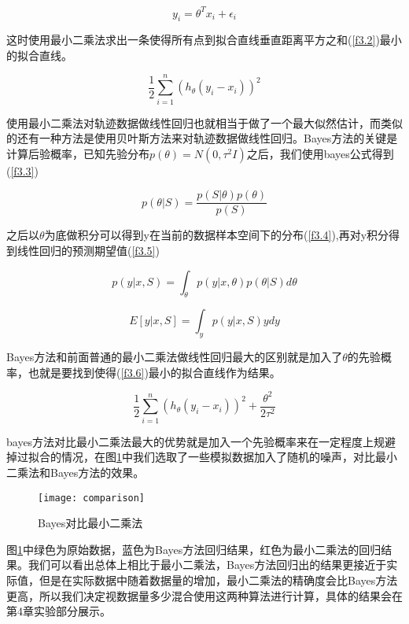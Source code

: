 \begin{equation}
y_{i} = \theta^{T}x_{i}+ \epsilon_{i}
\label{f3.1}
\end{equation}

这时使用最小二乘法求出一条使得所有点到拟合直线垂直距离平方之和(\ref{f3.2})最小的拟合直线。

\begin{equation}
\frac{1}{2} \sum_{i=1}^{n} (h_{\theta} (y_{i}-x_{i}))^{2}
\label{f3.2}
\end{equation}

使用最小二乘法对轨迹数据做线性回归也就相当于做了一个最大似然估计，而类似的还有一种方法是使用贝叶斯方法来对轨迹数据做线性回归。Bayes方法的关键是计算后验概率，已知先验分布$p(\theta )= N(0,\tau^{2}I)$之后，我们使用bayes公式得到(\ref{f3.3})

\begin{equation}
p(\theta |S) = \frac{p(S|\theta )p(\theta )}{p(S)} 
\label{f3.3}
\end{equation}

之后以$\theta$为底做积分可以得到y在当前的数据样本空间下的分布(\ref{f3.4}),再对y积分得到线性回归的预测期望值(\ref{f3.5})

\begin{equation}
p(y|x,S)=\int_{\theta}p(y|x,\theta )p(\theta |S)d\theta
\label{f3.4}
\end{equation}

\begin{equation}
E[y|x,S]=\int_{y}p(y|x,S)ydy
\label{f3.5}
\end{equation}

Bayes方法和前面普通的最小二乘法做线性回归最大的区别就是加入了$\theta$的先验概率，也就是要找到使得(\ref{f3.6})最小的拟合直线作为结果。

\begin{equation}
\frac{1}{2} \sum_{i=1}^{n} (h_{\theta} (y_{i}-x_{i}))^{2} + \frac{\theta ^{2}}{2\tau ^{2}}
\label{f3.6}
\end{equation}

bayes方法对比最小二乘法最大的优势就是加入一个先验概率来在一定程度上规避掉过拟合的情况，在图\ref{fig:3.2}中我们选取了一些模拟数据加入了随机的噪声，对比最小二乘法和Bayes方法的效果。

\begin{figure}[H] 
  \centering
  \texttt{[image: comparison]}
  \caption{Bayes对比最小二乘法}
  \label{fig:3.2}
\end{figure}

图\ref{fig:3.2}中绿色为原始数据，蓝色为Bayes方法回归结果，红色为最小二乘法的回归结果。我们可以看出总体上相比于最小二乘法，Bayes方法回归出的结果更接近于实际值，但是在实际数据中随着数据量的增加，最小二乘法的精确度会比Bayes方法更高，所以我们决定视数据量多少混合使用这两种算法进行计算，具体的结果会在第4章实验部分展示。

